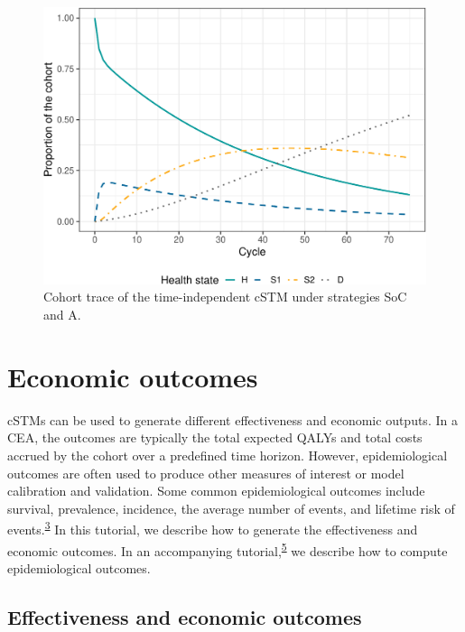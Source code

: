 \documentclass[
]{article}
\begin{document}
\begin{figure}[H]

{\centering \includegraphics{figs/Sick-Sicker-Trace-TimeHom-1} 

}

\caption{Cohort trace of the time-independent cSTM under strategies SoC and A.}\label{fig:Sick-Sicker-Trace-TimeHom}
\end{figure}

\hypertarget{economic-outcomes}{%
\section{Economic outcomes}\label{economic-outcomes}}

cSTMs can be used to generate different effectiveness and economic outputs. In a CEA, the outcomes are typically the total expected QALYs and total costs accrued by the cohort over a predefined time horizon. However, epidemiological outcomes are often used to produce other measures of interest or model calibration and validation. Some common epidemiological outcomes include survival, prevalence, incidence, the average number of events, and lifetime risk of events.\textsuperscript{\protect\hyperlink{ref-Siebert2012c}{3}} In this tutorial, we describe how to generate the effectiveness and economic outcomes. In an accompanying tutorial,\textsuperscript{\protect\hyperlink{ref-Alarid-Escudero2021b}{5}} we describe how to compute epidemiological outcomes.

\hypertarget{effectiveness-and-economic-outcomes}{%
\subsection{Effectiveness and economic outcomes}\label{effectiveness-and-economic-outcomes}}
\end{document}
